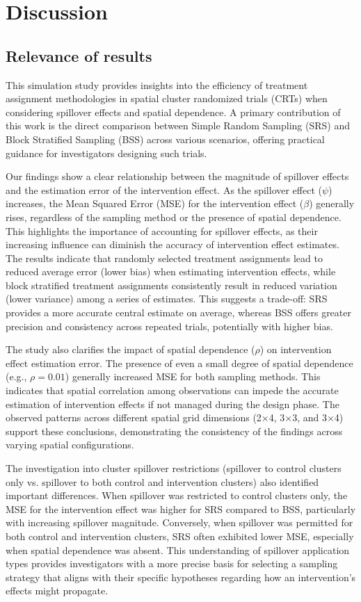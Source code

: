 \documentclass{article}[11pt]
\begin{document}
\section{Discussion}

\subsection{Relevance of results}

This simulation study provides insights into the efficiency of treatment assignment methodologies in spatial cluster randomized trials (CRTs) when considering spillover effects and spatial dependence. A primary contribution of this work is the direct comparison between Simple Random Sampling (SRS) and Block Stratified Sampling (BSS) across various scenarios, offering practical guidance for investigators designing such trials. 

Our findings show a clear relationship between the magnitude of spillover effects and the estimation error of the intervention effect. As the spillover effect ($\psi$) increases, the Mean Squared Error (MSE) for the intervention effect ($\beta$) generally rises, regardless of the sampling method or the presence of spatial dependence. This highlights the importance of accounting for spillover effects, as their increasing influence can diminish the accuracy of intervention effect estimates. The results indicate that randomly selected treatment assignments lead to reduced average error (lower bias) when estimating intervention effects, while block stratified treatment assignments consistently result in reduced variation (lower variance) among a series of estimates. This suggests a trade-off: SRS provides a more accurate central estimate on average, whereas BSS offers greater precision and consistency across repeated trials, potentially with higher bias. 

The study also clarifies the impact of spatial dependence ($\rho$) on intervention effect estimation error. The presence of even a small degree of spatial dependence (e.g., $\rho=0.01$) generally increased MSE for both sampling methods. This indicates that spatial correlation among observations can impede the accurate estimation of intervention effects if not managed during the design phase. The observed patterns across different spatial grid dimensions (2×4, 3×3, and 3×4) support these conclusions, demonstrating the consistency of the findings across varying spatial configurations. 

The investigation into cluster spillover restrictions (spillover to control clusters only vs. spillover to both control and intervention clusters) also identified important differences. When spillover was restricted to control clusters only, the MSE for the intervention effect was higher for SRS compared to BSS, particularly with increasing spillover magnitude. Conversely, when spillover was permitted for both control and intervention clusters, SRS often exhibited lower MSE, especially when spatial dependence was absent. This understanding of spillover application types provides investigators with a more precise basis for selecting a sampling strategy that aligns with their specific hypotheses regarding how an intervention's effects might propagate.
\end{document}
